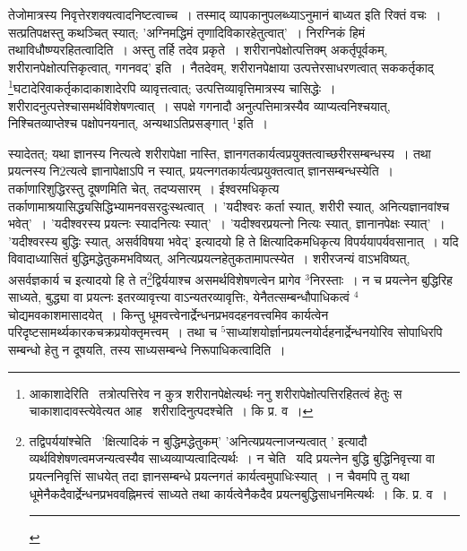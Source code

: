 \documentclass[11pt, openany]{book}
\begin{document}
{\newpage
\begin{sloppypar}
\noindent
तेजोमात्रस्य निवृत्तेरशक्यत्वादनिष्टत्वाच्च~। तस्माद् व्यापकानुपलब्ध्याऽनुमानं बाध्यत इति रिक्तं वचः~। सत्प्रतिपक्षस्तु कथञ्चित् स्यात्; 'अग्निमद्धिमं तृणादिविकारहेतुत्वात्'~। निरग्निकं हिमं तथाविधौष्ण्यरहितत्वादिति~। अस्तु तर्हि तदेव प्रकृते~। शरीरानपेक्षोत्पत्तिक्म् अकर्तृपूर्वकम्, शरीरानपेक्षोत्पत्तिकृत्वात्, गगनवद्' इति~। नैतदेवम्, शरीरानपेक्षाया उत्पत्तेरसाधरणत्वात् सककर्तृकाद् \renewcommand{\thefootnote}{१}\footnote{आकाशादेरिति \textendash\ तत्रोत्पत्तिरेव न कुत्र शरीरानपेक्षेत्यर्थः ननु शरीरापेक्षोत्पत्तिरहितत्वं हेतुः स चाकाशादावस्त्येवेत्यत आह \textendash\ शरीरादिनुत्पदश्चेति~। कि प्र. व~।}घटादेरिवाकर्तृकादाकाशादेरपि व्यावृत्तत्वात्; उत्पत्तिव्यावृत्तिमात्रस्य चासिद्धेः~। शरीरादनुत्पत्तेश्चासमर्थविशेषणत्वात्~। सपक्षे गगनादौ अनुत्पत्तिमात्रस्यैव व्याप्यत्वनिश्चयात्, निश्चितव्याप्तेश्च पक्षोपनयनात्, अन्यथाऽतिप्रसङ्गात् ${}^1$इति~।
\end{sloppypar}

स्यादेतत्; यथा ज्ञानस्य नित्यत्वे शरीरापेक्षा नास्ति, ज्ञानगतकार्यत्वप्रयुक्तत्वाच्छरीरसम्बन्धस्य~। तथा प्रयत्नस्य नि2त्यत्वे ज्ञानापेक्षाऽपि न स्यात्, प्रयत्नगतकार्यत्वप्रयुक्तत्वात् ज्ञानसम्बन्धस्येति~। तर्काणारिशुद्धिरस्तु दूषणमिति चेत्, तदप्यसारम्~। ईश्वरमधिकृत्य तर्काणामाश्रयासिद्ध्यसिद्धिभ्यामनवसरदुःस्थत्वात्~। 'यदीश्वरः कर्ता स्यात्, शरीरी स्यात्, अनित्यज्ञानवांश्च भवेत्'~। 'यदीश्वरस्य प्रयत्नः स्यादनित्यः स्यात्'~। 'यदीश्वरप्रयत्नो नित्यः स्यात्, ज्ञानानपेक्षः स्यात्'~। 'यदीश्वरस्य बुद्धिः स्यात्, असर्वविषया भवेद्' इत्यादयो हि ते क्षित्यादिकमधिकृत्य विपर्ययापर्यवसानात्~। यदि विवादाध्यासितं बुद्धिमद्धेतुकमभविष्यत्, अनित्यप्रयत्नहेतुकतामापत्स्येत~। शरीरजन्यं वाऽभविष्यत्, असर्वज्ञकार्य च इत्यादयो हि ते त\renewcommand{\thefootnote}{२}\footnote{तद्विपर्ययांश्चेति \textendash\ 'क्षित्यादिकं न बुद्धिमद्धेतुकम्' 'अनित्यप्रयत्नाजन्यत्वात् ' इत्यादौ व्यर्थविशेषणत्वमजन्यत्वस्यैव साध्यव्याप्यत्वादित्यर्थः~। न चेति \textendash\ यदि प्रयत्नेन बुद्धि बुद्धिनिवृत्त्या वा प्रयत्ननिवृत्तिं साधयेत् तदा ज्ञानसम्बन्धे प्रयत्नगतं कार्यत्वमुपाधिःस्यात्~। न चैवमपि तु यथा धूमेनैकदैवार्द्रेन्धनप्रभववह्निमत्त्वं साध्यते तथा कार्यत्वेनैकदैव प्रयत्नबुद्धिसाधनमित्यर्थः~। कि. प्र. व~।\\ \rule{0.4\linewidth}{0.5pt}}द्विर्ययाश्च असमर्थविशेषणत्वेन प्रागेव ${}^3$निरस्ताः~। न च प्रयत्नेन बुद्धिरिह साध्यते, बुद्ध्या वा प्रयत्नः इतरव्यावृत्त्या वाऽन्यतरव्यावृत्तिः, येनैतत्सम्बन्धौपाधिकत्वं ${}^4$चोद्यमवकाशमासादयेत्~। किन्तु धूमवत्त्वेनार्द्रेन्धनप्रभवदहनवत्त्वमिव कार्यत्वेन परिदृष्टसामर्थ्यकारकचक्रप्रयोक्तृमत्त्वम्~। तथा च ${}^5$साध्यांशयोर्ज्ञानप्रयत्नयोर्दहनार्द्रेन्धनयोरिव सोपाधिरपि सम्बन्धो हेतु न दूषयति, तस्य साध्यसम्बन्धे निरूपाधिकत्वादिति~।

}
\end{document}
